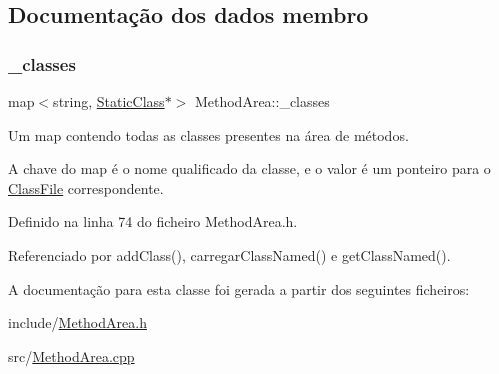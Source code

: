 \subsection{Documentação dos dados membro}
\mbox{\label{classMethodArea_a1244d392d351920d754db8c6940dd7aa}} 
\subsubsection{\texorpdfstring{\+\_\+classes}{\_classes}}
{\footnotesize\ttfamily map$<$string, \hyperlink{classStaticClass}{Static\+Class}$\ast$$>$ Method\+Area\+::\+\_\+classes\hspace{0.3cm}{\ttfamily [private]}}

Um {\ttfamily map} contendo todas as classes presentes na área de métodos.

A chave do map é o nome qualificado da classe, e o valor é um ponteiro para o {\ttfamily \hyperlink{classClassFile}{Class\+File}} correspondente. 

Definido na linha 74 do ficheiro Method\+Area.\+h.



Referenciado por add\+Class(), carregar\+Class\+Named() e get\+Class\+Named().



A documentação para esta classe foi gerada a partir dos seguintes ficheiros\+:\begin{DoxyCompactItemize}
\item 
include/\hyperlink{MethodArea_8h}{Method\+Area.\+h}\item 
src/\hyperlink{MethodArea_8cpp}{Method\+Area.\+cpp}\end{DoxyCompactItemize}
